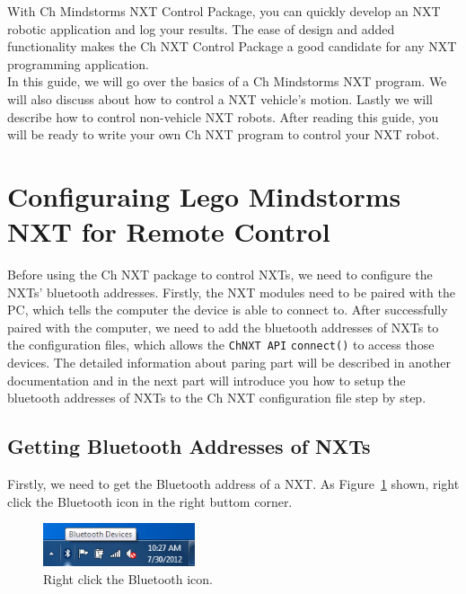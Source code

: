 \documentclass[11pt]{article}
\begin{document}
With Ch Mindstorms NXT Control Package, you can quickly develop an NXT robotic application and log 
your results. The ease of design and added functionality makes the Ch NXT Control Package a good 
candidate for any NXT programming application.\\

In this guide, we will go over the basics of a Ch Mindstorms NXT program. We will also discuss 
about how to control a NXT vehicle's motion. Lastly we will describe how to control non-vehicle
NXT robots. After reading this guide, you will be ready to write your own Ch NXT program to 
control your NXT robot.

\newpage
\section{Configuraing Lego Mindstorms NXT for Remote Control}
Before using the Ch NXT package to control NXTs, we need to configure the NXTs' bluetooth addresses.
Firstly, the NXT modules need to be paired with the PC, which tells the computer the device is able
to connect to. After successfully paired with the computer, we need to add the bluetooth addresses of
NXTs to the configuration files, which allows the \texttt{ChNXT API} \texttt{connect()} to access
those devices. The detailed information about paring part will be described in another documentation
and in the next part will introduce you how to setup the bluetooth addresses of NXTs to the Ch NXT
configuration file step by step.

\subsection{Getting Bluetooth Addresses of NXTs}
Firstly, we need to get the Bluetooth address of a NXT. As Figure~\ref{fig:bt_device} shown, right click
the Bluetooth icon in the right buttom corner.

\begin{figure}[H]
  \begin{center}
    \includegraphics[height=0.5in]{figure/configuration/getBTaddress/bt1.png}
    \caption{Right click the Bluetooth icon.\label{fig:bt_device}}
  \end{center}
\end{figure}
\end{document}
